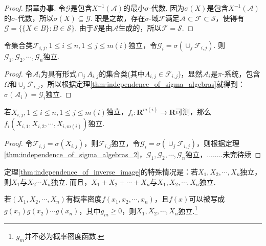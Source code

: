 \begin{proof}
    照章办事. 令$\mathcal{G}$是包含$X^{-1}(\mathcal{A})$的最小$\sigma$-代数. 因为$\sigma(X)$是包含$X^{-1}(\mathcal{A})$的$\sigma$-代数，所以$\sigma(X)\subseteq \mathcal{G}$. 职是之故，存在$\sigma$-域$\mathcal{F}$满足$\mathcal{A}\subset \mathcal{F}\subset\mathcal{S}$，使得有$\mathcal{G}=\{\{X\in B\}:B\in\mathcal{S}\}$. 由于$\mathcal{S}$是由$\mathcal{A}$生成的，所以$\mathcal{F}=\mathcal{S}$.
\end{proof}

\begin{theorem}\label{thm:independence_of_sigma_algebras_2}
    令集合类$\mathcal{F}_{i,j},1\le i\le n,1\le j\le m(i)$独立，令$\mathcal{G}_i=\sigma(\cup_j\mathcal{F}_{i,j})$. 则$\mathcal{G}_1,\mathcal{G}_2,\cdots,\mathcal{G}_n$独立.
\end{theorem}

\begin{proof}
    令$\mathcal{A}_i$为具有形式$\cap_j A_{i,j}$的集合类(其中$A_{i,j}\in\mathcal{F}_{i,j}$)，显然$\mathcal{A}_i$是$\pi$-系统，包含$\Omega$和$\cup_j\mathcal{F}_{i,j}$，所以根据定理\ref{thm:independence_of_sigma_algebras}就得到：$\sigma(\mathcal{A}_i)=\mathcal{G}_i$独立.
\end{proof}

\begin{theorem}\label{thm:independence_of_inverse_image}
    若$X_{i,j},1\le i\le n,1\le j\le m(i)$独立，$f_i:\mathbf{R}^{m(i)}\to \mathbf{R}$可测，那么$f_i(X_{i,1},X_{i,2},\cdots,X_{i,m(i)})$独立.
\end{theorem}

\begin{proof}
    令$\mathcal{F}_{i,j}=\sigma(X_{i,j})$，则$\mathcal{F}_{i,j}$独立，令$\mathcal{G}_i=\sigma(\cup_j\mathcal{F}_{i,j})$，则根据定理\ref{thm:independence_of_sigma_algebras_2}，$\mathcal{G}_1,\mathcal{G}_2,\cdots,\mathcal{G}_n$独立，........未完待续
\end{proof}

定理\ref{thm:independence_of_inverse_image}的特殊情况是：若$X_1,X_2,\cdots,X_n$独立，则$X_1$与$X_2\cdots X_n$独立. 而且，$X_1+X_2+\cdots+X_n$与$X_1,X_2,\cdots ,X_n$独立.

\begin{exercise}
    若$(X_1,X_2,\cdots,X_n)$有概率密度$f(x_1,x_2,\cdots,x_n)$，且$f(x)$可以被写成$g(x_1)g(x_2)\cdots g(x_n)$，其中$g_m\ge 0$，则$X_1,X_2,\cdots,X_n$独立.\footnote{$g_m$并不必为概率密度函数.}
\end{exercise}

